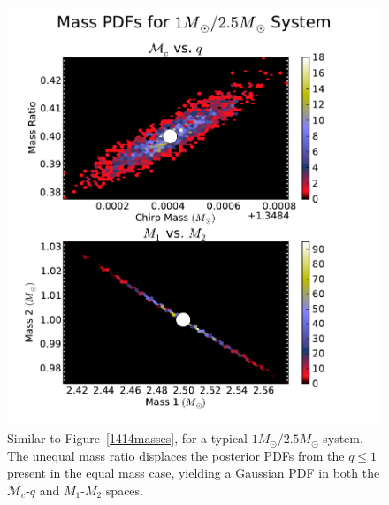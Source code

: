 \documentclass[11pt,a4paper]{emulateapj} 
\newcommand{\chmass}{\mathcal{M}_c}
\begin{document}
\begin{figure}[h!]
  \centering \includegraphics[trim=1cm 0cm 2cm 0cm,
    clip=false,scale=0.63]{125masses2D.pdf}
 \caption{Similar to Figure~\ref{1414masses}, for a typical
   $1M_{\odot}/2.5M_{\odot}$ system.  The unequal mass ratio displaces
   the posterior PDFs from the $q \leq 1$ present in the equal mass
   case, yielding a Gaussian PDF in both the $\chmass$-$q$ and
   $M_1$-$M_2$ spaces.}
  \label{125masses}
\end{figure}
\end{document}
